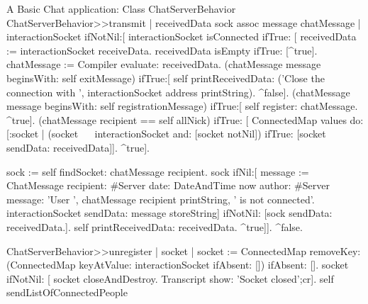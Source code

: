 \documentclass[a4paper,10pt,twoside]{book}
\begin{document}
\begin{script}{A Basic Chat application: Class ChatServerBehavior}
ChatServerBehavior>>transmit
	| receivedData  sock assoc message chatMessage |
	interactionSocket ifNotNil:[
		interactionSocket isConnected 
			ifTrue: [	
				receivedData := interactionSocket receiveData.
				receivedData isEmpty ifTrue: [^true].
				chatMessage := Compiler evaluate: receivedData.
				(chatMessage message beginsWith: self exitMessage) 
					ifTrue:[
						self printReceivedData: ('Close the connection with ', interactionSocket address printString).
						^false].
				(chatMessage message beginsWith: self registrationMessage)
					ifTrue:[
						self register: chatMessage.
						^true].
				(chatMessage recipient == self allNick)
					ifTrue: [
						ConnectedMap values do: [:socket |
							(socket ~~ interactionSocket and: [socket notNil])
								ifTrue: [socket sendData: receivedData]].
						^true].
				
				sock := self findSocket: chatMessage recipient.
				sock 
					ifNil:[
						message := ChatMessage
										recipient: #Server
										date: DateAndTime now
										author: #Server
										message: 'User ', chatMessage recipient printString, ' is not connected'.
						interactionSocket sendData: message storeString]
					ifNotNil: [sock sendData: receivedData.].
				self printReceivedData: receivedData.
				^true]].
	^false.


ChatServerBehavior>>unregister
	| socket |
	socket := ConnectedMap removeKey: (ConnectedMap keyAtValue: interactionSocket ifAbsent: []) ifAbsent: [].
	socket ifNotNil: [
		 socket closeAndDestroy.
		Transcript show: 'Socket closed';cr].
	self sendListOfConnectedPeople
\end{script}
\end{document}
